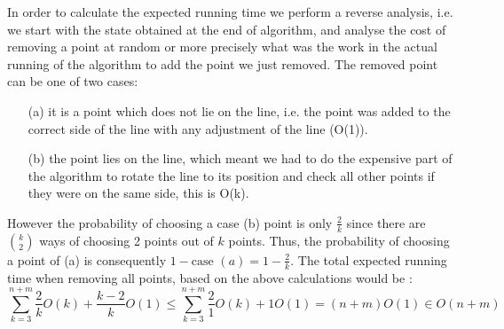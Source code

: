 In order to calculate the expected running time we perform a reverse analysis, i.e. we start with the state obtained at the end of algorithm, and analyse the cost of removing a point at random or more precisely what was the work in the actual running of the algorithm to add the point we just removed. The removed point can be one of two cases: \begin{enumerate}
	\item[(a)] it is a point which does not lie on the line, i.e. the point was added
to the correct side of the line with any adjustment of the line (O(1)).
\item[(b)] the point lies on the line, which meant we had to do the expensive part of the algorithm to rotate the line to its position and check all other points if they were on the same side, this is O(k).
\end{enumerate}
However the probability of choosing a case (b) point is only $\frac{2}{k}$ since there are $\binom{k}{2}$ ways of choosing 2 points out of $k$ points. Thus, the probability of choosing a point of (a) is consequently $1-\text{case } (a) = 1 - \frac{2}{k}$. The total expected running time when removing all points, based on the above calculations would be : $$\sum^{n+m}_{k=3}{\frac{2}{k}O(k)+\frac{k-2}{k}O(1)}\leq\sum^{n+m}_{k=3}{\frac{2}{1}O(k)+1O(1)}=(n+m)O(1)\in O(n+m)$$